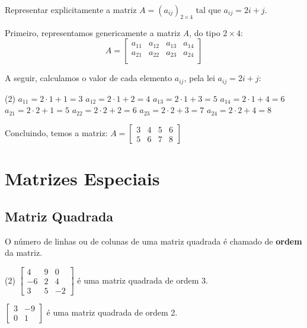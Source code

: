 \begin{exercise}
  Representar explicitamente a matriz $A = (a_{ij})_{2 \times 4}$ tal que $a_{ij} = 2i + j$.

  Primeiro, representamos genericamente a matriz \textit{A}, do tipo $2 \times 4$:
  \begin{equation*}
    A = \begin{bmatrix}
      a_{11} & a_{12} & a_{13} & a_{14} \\
      a_{21} & a_{22} & a_{23} & a_{24} \\
    \end{bmatrix}
  \end{equation*}

  A seguir, calculamos o valor de cada elemento $a_{ij}$, pela lei $a_{ij} = 2i + j$:

  \begin{tasks}(2)
    \task[] $a_{11} = 2 \cdot 1 + 1 = 3$
    \task[] $a_{12} = 2 \cdot 1 + 2 = 4$
    \task[] $a_{13} = 2 \cdot 1 + 3 = 5$
    \task[] $a_{14} = 2 \cdot 1 + 4 = 6$
    \task[] $a_{21} = 2 \cdot 2 + 1 = 5$
    \task[] $a_{22} = 2 \cdot 2 + 2 = 6$
    \task[] $a_{23} = 2 \cdot 2 + 3 = 7$
    \task[] $a_{24} = 2 \cdot 2 + 4 = 8$
  \end{tasks}

  Concluindo, temos a matriz: $A = \begin{bmatrix}
    3 & 4 & 5 & 6 \\
    5 & 6 & 7 & 8
  \end{bmatrix}$
\end{exercise}

\section{Matrizes Especiais}

\subsection{Matriz Quadrada}


O número de linhas ou de colunas de uma matriz quadrada é chamado de \textbf{ordem} da matriz.

\begin{examples}\leavevmode
  \begin{tasks}(2)
    \task $\begin{bmatrix}
      4 & 9 & 0 \\
      -6 & 2 & 4 \\
      3 & 5 & -2
    \end{bmatrix}$
    é uma matriz quadrada de ordem 3.

    \task $\begin{bmatrix}
      3 & -9 \\
      0 & 1
    \end{bmatrix}$
    é uma matriz quadrada de ordem 2.
  \end{tasks}
\end{examples}

